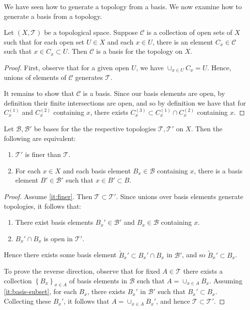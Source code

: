 We have seen how to generate a topology from a basis. We now examine how to
generate a basis from a topology.
\begin{theorem}
\label{thm:basis-from-top}
Let $(X, \mathcal{T})$ be a topological space. Suppose $\mathcal{C}$ is a collection of
open sets of $X$ such that for each open set $U \in X$ and each
$x \in U$, there is an element $C_{x} \in \mathcal{C}$ such
that $x \in C_{x}
\subset U$. Then $\mathcal{C}$ is a basis for the topology on $X$.
\end{theorem}
\begin{proof}
First, observe that for a given open $U$, we have
$\cup_{x \in U}C_{x} = U$. Hence, unions of elements of $\mathcal{C}$
generates $\mathcal{T}$.

It remains to show that $\mathcal{C}$ is a basis.
Since our basis elements are open, by definition their finite intersections
are open, and so by definition we have that for $C_{x}^{(1)}$ and
$C_{x}^{(2)}$ containing $x$, there exists $C_{x}^{(3)} \subset
C_{x}^{(1)} \cap C_{x}^{(2)}$ containing $x$.
\end{proof}
\begin{lemma}
\label{lem:finer-coarser-basis}
Let $\mathcal{B}, \mathcal{B'}$ be bases for the the respective topologies
$\mathcal{T}, \mathcal{T'}$ on $X$. Then the following are equivalent:
\begin{enumerate}
  \item\label{it:finer} $\mathcal{T'}$ is finer than $\mathcal{T}$.
  \item\label{it:basis-subset} For each $x \in X$ and each basis element $B_{x} \in \mathcal{B}$
  containing $x$, there is a basis element $B' \in \mathcal{B'}$ such that
  $x \in B' \subset B$.
\end{enumerate}
\end{lemma}
\begin{proof}
Assume \cref{it:finer}. Then $\mathcal{T} \subset \mathcal{T'}$.
Since unions over basis elements generate topologies,
it follows that:
\begin{enumerate}
  \item There exist basis elements $B_{x}' \in \mathcal{B'}$ and
  $B_{x} \in \mathcal{B}$ containing $x$.
  \item $B_{x}' \cap B_{x}$ is open in $\mathcal{T'}$.
\end{enumerate}
Hence there exists some basis
element $\tilde{B}_{x}' \subset B_{x}' \cap B_{x}$ in $\mathcal{B'}$, and so
$\tilde{B}_{x}' \subset B_{x}$.

To prove the reverse direction, observe that for fixed $A \in \mathcal{T}$ there
exists a collection $\left\{ B_{x} \right\}_{x \in A}$ of basis elements in
$\mathcal{B}$ such that $A = \cup_{x \in A} B_{x}$.
Assuming \cref{it:basis-subset}, for each $B_{x}$, there exists $B_{x}'$ in
$\mathcal{B'}$ such that $B_{x}' \subset B_{x}$. Collecting these $B_{x}'$, it
follows that $A = \cup_{x \in A} B_{x}'$, and hence
$\mathcal{T} \subset \mathcal{T'}$.
\end{proof}
